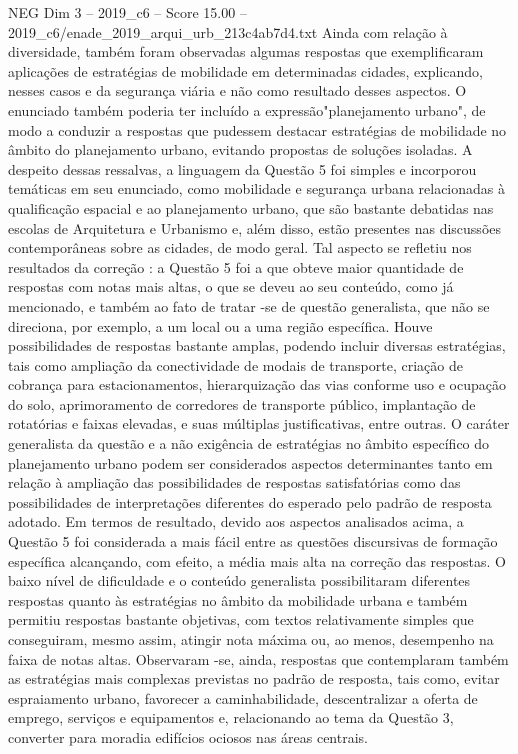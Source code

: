 \begin{textsample}{NEG Dim 3 – 2019\_c6 – Score 15.00 – 2019\_c6/enade\_2019\_arqui\_urb\_213c4ab7d4.txt}
Ainda com relação à diversidade, também foram observadas algumas respostas que exemplificaram aplicações de estratégias de mobilidade em determinadas cidades, explicando, nesses casos e da segurança viária e não como resultado desses aspectos.
O enunciado também poderia ter incluído a expressão"planejamento urbano", de modo a conduzir a respostas que pudessem destacar estratégias de mobilidade no âmbito do planejamento urbano, evitando propostas de soluções isoladas.
A despeito dessas ressalvas, a linguagem da Questão 5 foi simples e incorporou temáticas em seu enunciado, como mobilidade e segurança urbana relacionadas à qualificação espacial e ao planejamento urbano, que são bastante debatidas nas escolas de Arquitetura e Urbanismo e, além disso, estão presentes nas discussões contemporâneas sobre as cidades, de modo geral.
Tal aspecto se refletiu nos resultados da correção : a Questão 5 foi a que obteve maior quantidade de respostas com notas mais altas, o que se deveu ao seu conteúdo, como já mencionado, e também ao fato de tratar -se de questão generalista, que não se direciona, por exemplo, a um local ou a uma região específica.
Houve possibilidades de respostas bastante amplas, podendo incluir diversas estratégias, tais como ampliação da conectividade de modais de transporte, criação de cobrança para estacionamentos, hierarquização das vias conforme uso e ocupação do solo, aprimoramento de corredores de transporte público, implantação de rotatórias e faixas elevadas, e suas múltiplas justificativas, entre outras.
O caráter generalista da questão e a não exigência de estratégias no âmbito específico do planejamento urbano podem ser considerados aspectos determinantes tanto em relação à ampliação das possibilidades de respostas satisfatórias como das possibilidades de interpretações diferentes do esperado pelo padrão de resposta adotado.
Em termos de resultado, devido aos aspectos analisados acima, a Questão 5 foi considerada a mais fácil entre as questões discursivas de formação específica alcançando, com efeito, a média mais alta na correção das respostas.
O baixo nível de dificuldade e o conteúdo generalista possibilitaram diferentes respostas quanto às estratégias no âmbito da mobilidade urbana e também permitiu respostas bastante objetivas, com textos relativamente simples que conseguiram, mesmo assim, atingir nota máxima ou, ao menos, desempenho na faixa de notas altas.
Observaram -se, ainda, respostas que contemplaram também as estratégias mais complexas previstas no padrão de resposta, tais como, evitar espraiamento urbano, favorecer a caminhabilidade, descentralizar a oferta de emprego, serviços e equipamentos e, relacionando ao tema da Questão 3, converter para moradia edifícios ociosos nas áreas centrais.

\end{textsample}
